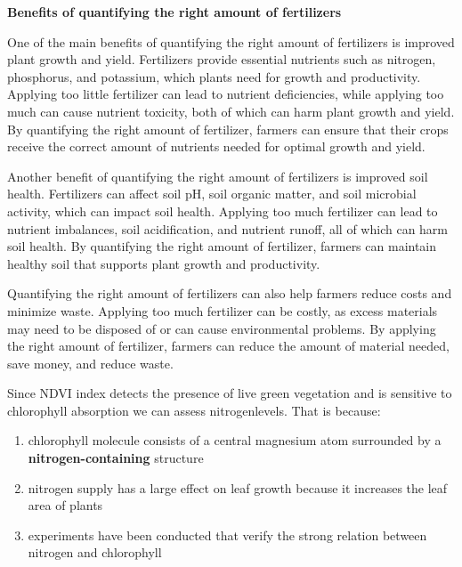 \documentclass{article}
\begin{document}
{                \newpage
                \textbf{Benefits of quantifying the right amount of fertilizers}\par
                One of the main benefits of quantifying the right amount of fertilizers is improved plant growth and yield. Fertilizers provide essential nutrients such as nitrogen, phosphorus, and potassium, which plants need for growth and productivity. Applying too little fertilizer can lead to nutrient deficiencies, while applying too much can cause nutrient toxicity, both of which can harm plant growth and yield. By quantifying the right amount of fertilizer, farmers can ensure that their crops receive the correct amount of nutrients needed for optimal growth and yield.\par
                Another benefit of quantifying the right amount of fertilizers is improved soil health. Fertilizers can affect soil pH, soil organic matter, and soil microbial activity, which can impact soil health. Applying too much fertilizer can lead to nutrient imbalances, soil acidification, and nutrient runoff, all of which can harm soil health. By quantifying the right amount of fertilizer, farmers can maintain healthy soil that supports plant growth and productivity.\par
                Quantifying the right amount of fertilizers can also help farmers reduce costs and minimize waste. Applying too much fertilizer can be costly, as excess materials may need to be disposed of or can cause environmental problems. By applying the right amount of fertilizer, farmers can reduce the amount of material needed, save money, and reduce waste.\par
                Since NDVI index detects the presence of live green vegetation and is sensitive to chlorophyll absorption we can assess nitrogenlevels. That is because:
                
                \begin{enumerate}
                    \item chlorophyll molecule consists of a central magnesium atom surrounded  by a \textbf{nitrogen-containing}  structure
                    \item nitrogen supply has a large effect on leaf growth because it increases the leaf area of plants
                    \item experiments  have been conducted that verify the strong relation between nitrogen and chlorophyll
                \end{enumerate}
                \vspace*{4\baselineskip}
                
}
\end{document}

